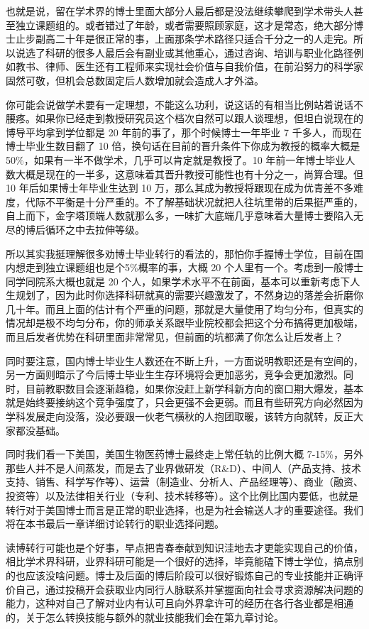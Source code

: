 \documentclass[]{tufte-book}
\begin{document}
也就是说，留在学术界的博士里面大部分人最后都是没法继续攀爬到学术带头人甚至独立课题组的。或者错过了年龄，或者需要照顾家庭，这才是常态，绝大部分博士止步副高二十年是很正常的事，上面那条学术路径只适合千分之一的人走完。所以说选了科研的很多人最后会有副业或其他重心，通过咨询、培训与职业化路径例如教书、律师、医生还有工程师来实现社会价值与自我价值，在前沿努力的科学家固然可敬，但机会总数固定后人数增加就会造成人才外溢。

你可能会说做学术要有一定理想，不能这么功利，说这话的有相当比例站着说话不腰疼。如果你已经走到教授研究员这个档次自然可以跟人谈理想，但坦白说现在的博导平均拿到学位都是 20 年前的事了，那个时候博士一年毕业 7 千多人，而现在博士毕业生数目翻了 10 倍，换句话在目前的晋升条件下你成为教授的概率大概是 50\%，如果有一半不做学术，几乎可以肯定就是教授了。10 年前一年博士毕业人数大概是现在的一半多，这意味着其晋升教授可能性也有十分之一，尚算合理。但 10 年后如果博士年毕业生达到 10 万，那么其成为教授将跟现在成为优青差不多难度，代际不平衡是十分严重的。不了解基础状况就把人往坑里带的后果挺严重的，自上而下，金字塔顶端人数就那么多，一味扩大底端几乎意味着大量博士要陷入无尽的博后循环之中去拉伸等级。

所以其实我挺理解很多劝博士毕业转行的看法的，那怕你手握博士学位，目前在国内想走到独立课题组也是个5\%概率的事，大概 20 个人里有一个。考虑到一般博士同学同院系大概也就是 20 个人，如果学术水平不在前面，基本可以重新考虑下人生规划了，因为此时你选择科研就真的需要兴趣激发了，不然身边的落差会折磨你几十年。而且上面的估计有个严重的问题，那就是大量使用了均匀分布，但真实的情况却是极不均匀分布，你的师承关系跟毕业院校都会把这个分布搞得更加极端，而且后发者优势在科研里面非常常见，但前面的坑都满了你怎么让后发者上？

同时要注意，国内博士毕业生人数还在不断上升，一方面说明教职还是有空间的，另一方面则暗示了今后博士毕业生生存环境将会更加恶劣，竞争会更加激烈。同时，目前教职数目会逐渐趋稳，如果你没赶上新学科新方向的窗口期大爆发，基本就是始终要接纳这个竞争强度了，只会更强不会更弱。而且有些研究方向必然因为学科发展走向没落，没必要跟一伙老气横秋的人抱团取暖，该转方向就转，反正大家都没基础。

同时我们看一下美国，美国生物医药博士最终走上常任轨的比例大概 7-15\%，另外那些人并不是人间蒸发，而是去了业界做研发（R\&D）、中间人（产品支持、技术支持、销售、科学写作等）、运营（制造业、分析人、产品经理等）、商业（融资、投资等）以及法律相关行业（专利、技术转移等）。这个比例比国内要低，也就是转行对于美国博士而言是正常的职业选择，也是为社会输送人才的重要途径。我们将在本书最后一章详细讨论转行的职业选择问题。

读博转行可能也是个好事，早点把青春奉献到知识洼地去才更能实现自己的价值，相比学术界科研，业界科研可能是一个很好的选择，毕竟能磕下博士学位，搞点别的也应该没啥问题。博士及后面的博后阶段可以很好锻炼自己的专业技能并正确评价自己，通过投稿开会获取业内同行人脉联系并掌握面向社会寻求资源解决问题的能力，这种对自己了解对业内有认可且向外界拿许可的经历在各行各业都是相通的，关于怎么转换技能与额外的就业技能我们会在第九章讨论。
\end{document}
